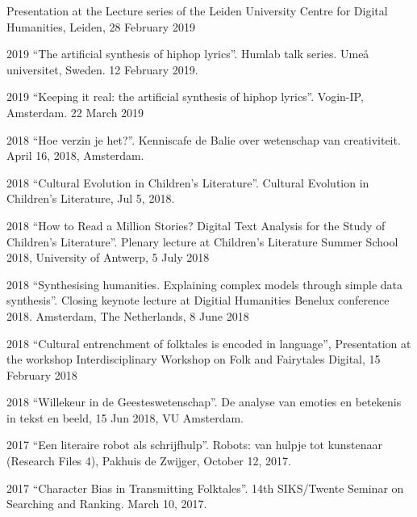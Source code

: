 \documentclass[12pt,letterpaper]{report}
\begin{document}
\begin{tablist}
  Presentation at the Lecture series of the Leiden University Centre for Digital
  Humanities, Leiden, 28 February 2019
\item[2019] \tab{}``The artificial synthesis of hiphop lyrics''. Humlab talk series. Umeå
  universitet, Sweden. 12 February 2019.
\item[2019] \tab{}``Keeping it real: the artificial synthesis of hiphop lyrics''. Vogin-IP,
  Amsterdam. 22 March 2019
\item[2018] \tab{}``Hoe verzin je het?''. Kenniscafe de Balie over wetenschap van
  creativiteit. April 16, 2018, Amsterdam. 
\item[2018] \tab{}``Cultural Evolution in Children’s Literature''. Cultural Evolution in
  Children's Literature, Jul 5, 2018. 
\item[2018] \tab{}``How to Read a Million Stories? Digital Text Analysis for the Study of
  Children's Literature''. Plenary lecture at Children’s Literature Summer School 2018,
  University of Antwerp, 5 July 2018
\item[2018] \tab{}``Synthesising humanities. Explaining complex models through simple data
  synthesis''. Closing keynote lecture at Digitial Humanities Benelux conference 2018.
  Amsterdam, The Netherlands, 8 June 2018
\item[2018] \tab{}``Cultural entrenchment of folktales is encoded in language'',
  Presentation at the workshop Interdisciplinary Workshop on Folk and Fairytales Digital,
  15 February 2018
\item[2018] \tab{}``Willekeur in de Geesteswetenschap''. De analyse van emoties en
  betekenis in tekst en beeld, 15 Jun 2018, VU Amsterdam.
\item[2017] \tab{}``Een literaire robot als schrijfhulp''. Robots: van hulpje tot
  kunstenaar (Research Files 4), Pakhuis de Zwijger, October 12, 2017. 
\item[2017] \tab{}``Character Bias in Transmitting Folktales''. 14th SIKS/Twente Seminar
  on Searching and Ranking. March 10, 2017. 
\end{tablist}
\end{document}
